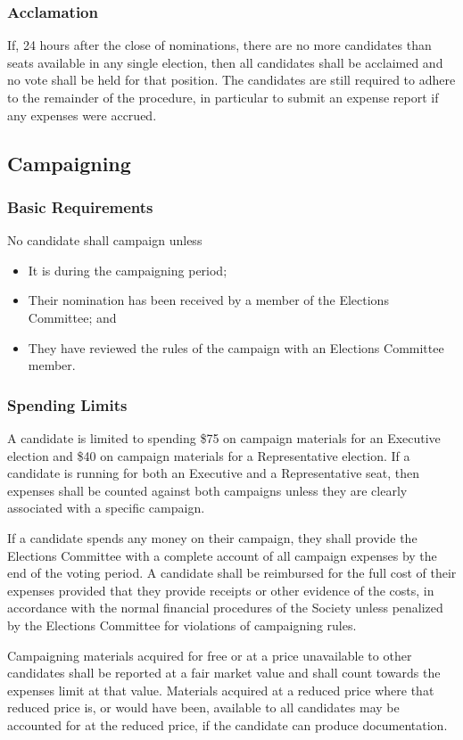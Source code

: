 \subsubsection{Acclamation}
If, 24 hours after the close of nominations, there are no more candidates than seats available in any single election, then all candidates shall be acclaimed and no vote shall be held for that position.
The candidates are still required to adhere to the remainder of the procedure, in particular to submit an expense report if any expenses were accrued.

\subsection{Campaigning}
\subsubsection{Basic Requirements}
No candidate shall campaign unless
\begin{itemize}
	\item It is during the campaigning period;
	\item Their nomination has been received by a member of the Elections Committee; and
	\item They have reviewed the rules of the campaign with an Elections Committee member.
\end{itemize}

\subsubsection{Spending Limits}
A candidate is limited to spending \$75 on campaign materials for an Executive election and \$40 on campaign materials for a Representative election.
If a candidate is running for both an Executive and a Representative seat, then expenses shall be counted against both campaigns unless they are clearly associated with a specific campaign.

If a candidate spends any money on their campaign, they shall provide the Elections Committee with a complete account of all campaign expenses by the end of the voting period.
A candidate shall be reimbursed for the full cost of their expenses provided that they provide receipts or other evidence of the costs, in accordance with the normal financial procedures of the Society unless penalized by the  Elections Committee for violations of campaigning rules.

Campaigning materials acquired for free or at a price unavailable to other candidates shall be reported at a fair market value and shall count towards the expenses limit at that value.
Materials acquired at a reduced price where that reduced price is, or would have been, available to all candidates may be accounted for at the reduced price, if the candidate can produce documentation.

